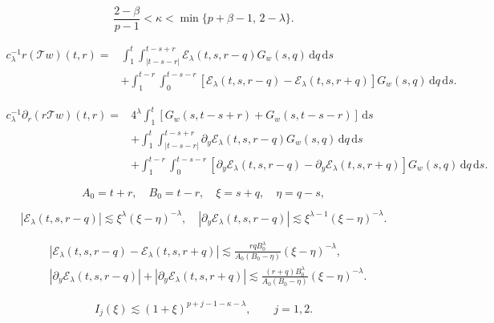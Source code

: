 \documentclass[10pt,a4paper]{amsart}
\newcommand{\Ecal}{\mathcal E}
\newcommand{\Tcal}{\mathcal T}
\newcommand{\dd}{\,\mathrm{d}}
\newcommand{\f}{\frac}
\newcommand{\p}{\partial}
\begin{document}
\begin{equation}
\label{eq:kappa-range}
\f{2-\beta}{p-1}
<\kappa
<\min\{p+\beta-1,\,2-\lambda\}.
\end{equation}

\begin{equation}
\label{qq:40}
\begin{aligned}
c_\lambda^{-1}r(\Tcal w)(t,r)
={}&
\int_1^t
\int_{|t-s-r|}^{t-s+r}
\Ecal_\lambda(t,s,r-q)
G_w(s,q)\dd q\dd s\\
&+\int_1^{t-r}
\int_0^{t-s-r}
\left[
\Ecal_\lambda(t,s,r-q)
-\Ecal_\lambda(t,s,r+q)
\right]
G_w(s,q)\dd q\dd s.
\end{aligned}
\end{equation}

\begin{equation}
\label{qq:42}
\begin{aligned}
c_\lambda^{-1}\p_r(r\Tcal w)(t,r)
={}&
4^\lambda
\int_1^t
\left[
G_w(s,t-s+r)
+G_w(s,t-s-r)
\right]\dd s\\
&+\int_1^t
\int_{|t-s-r|}^{t-s+r}
\p_y\Ecal_\lambda(t,s,r-q)
G_w(s,q)\dd q\dd s\\
&+\int_1^{t-r}
\int_0^{t-s-r}
\left[
\p_y\Ecal_\lambda(t,s,r-q)
-\p_y\Ecal_\lambda(t,s,r+q)
\right]
G_w(s,q)\dd q\dd s.
\end{aligned}
\end{equation}

\begin{equation}
\label{qq:44}
A_0=t+r,\quad B_0=t-r,\quad
\xi=s+q,\quad \eta=q-s,
\end{equation}

\begin{equation}
\label{qq:45}
|\Ecal_\lambda(t,s,r-q)|
\lesssim
\xi^\lambda(\xi-\eta)^{-\lambda},
\quad
|\p_y\Ecal_\lambda(t,s,r-q)|
\lesssim
\xi^{\lambda-1}(\xi-\eta)^{-\lambda}.
\end{equation}

\begin{equation}
\label{qq:46}
\begin{aligned}
&
\left|
\Ecal_\lambda(t,s,r-q)
-
\Ecal_\lambda(t,s,r+q)
\right|
\lesssim
\f{rqB_0^\lambda}{A_0(B_0-\eta)}
(\xi-\eta)^{-\lambda},\\
&
|\p_y\Ecal_\lambda(t,s,r-q)|
+
|\p_y\Ecal_\lambda(t,s,r+q)|
\lesssim
\f{(r+q)B_0^\lambda}{A_0(B_0-\eta)}
(\xi-\eta)^{-\lambda}.
\end{aligned}
\end{equation}

\begin{equation}
\label{eq:Ij}
I_j(\xi)
\lesssim
(1+\xi)^{p+j-1-\kappa-\lambda},
\qquad j=1,2.
\end{equation}
\end{document}
